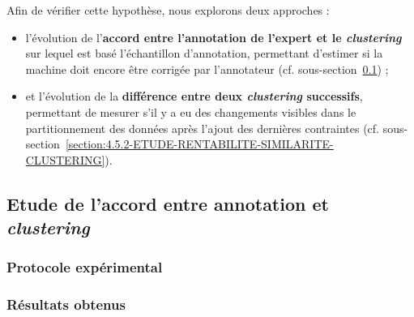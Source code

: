 	Afin de vérifier cette hypothèse, nous explorons deux approches :
	\begin{itemize}
		\item l'évolution de l'\textbf{accord entre l'annotation de l'expert et le \textit{clustering}} sur lequel est basé l'échantillon d'annotation, permettant d'estimer si la machine doit encore être corrigée par l'annotateur  (cf. sous-section~\ref{section:4.5.1-ETUDE-RENTABILITE-ACCORD-ANNOTATION-CLUSTERING}) ;
		\item et l'évolution de la \textbf{différence entre deux \textit{clustering} successifs}, permettant de mesurer s'il y a eu des changements visibles dans le partitionnement des données après l'ajout des dernières contraintes (cf. sous-section~\ref{section:4.5.2-ETUDE-RENTABILITE-SIMILARITE-CLUSTERING}).
	\end{itemize}
	
	
	\subsection{Etude de l'accord entre annotation et \textit{clustering}}
	\label{section:4.5.1-ETUDE-RENTABILITE-ACCORD-ANNOTATION-CLUSTERING}
		
	
		\subsubsection{Protocole expérimental}

		\subsubsection{Résultats obtenus}
		
			
